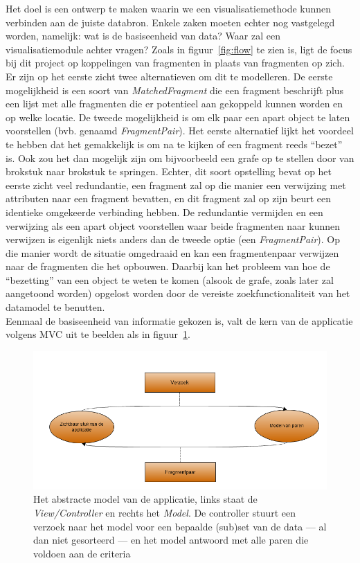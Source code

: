 Het doel is een ontwerp te maken waarin we een visualisatiemethode kunnen verbinden aan de juiste databron. Enkele zaken moeten echter nog vastgelegd worden, namelijk: wat is de basiseenheid van data? Waar zal een visualisatiemodule achter vragen? Zoals in figuur~\ref{fig:flow} te zien is, ligt de focus bij dit project op koppelingen van fragmenten in plaats van fragmenten op zich. Er zijn op het eerste zicht twee alternatieven om dit te modelleren. De eerste mogelijkheid is een soort van \emph{MatchedFragment} die een fragment beschrijft plus een lijst met alle fragmenten die er potentieel aan gekoppeld kunnen worden en op welke locatie. De tweede mogelijkheid is om elk paar een apart object te laten voorstellen (bvb. genaamd \emph{FragmentPair}). Het eerste alternatief lijkt het voordeel te hebben dat het gemakkelijk is om na te kijken of een fragment reeds ``bezet'' is. Ook zou het dan mogelijk zijn om bijvoorbeeld een grafe op te stellen door van brokstuk naar brokstuk te springen. Echter, dit soort opstelling bevat op het eerste zicht veel redundantie, een fragment zal op die manier een verwijzing met attributen naar een fragment bevatten, en dit fragment zal op zijn beurt een identieke omgekeerde verbinding hebben. De redundantie vermijden en een verwijzing als een apart object voorstellen waar beide fragmenten naar kunnen verwijzen is eigenlijk niets anders dan de tweede optie (een \emph{FragmentPair}). Op die manier wordt de situatie omgedraaid en kan een fragmentenpaar verwijzen naar de fragmenten die het opbouwen. Daarbij kan het probleem van hoe de ``bezetting'' van een object te weten te komen (alsook de grafe, zoals later zal aangetoond worden) opgelost worden door de vereiste zoekfunctionaliteit van het datamodel te benutten.\\

Eenmaal de basiseenheid van informatie gekozen is, valt de kern van de applicatie volgens MVC uit te beelden als in figuur~\ref{fig:basicprogramflow}.

\begin{figure}[ht]
	\begin{center}
		\includegraphics[width=1.0\columnwidth]{images/BasicExecutionFlow.png}
		\caption{Het abstracte model van de applicatie, links staat de \emph{View/Controller} en rechts het \emph{Model}. De controller stuurt een verzoek naar het model voor een bepaalde (sub)set van de data --- al dan niet gesorteerd --- en het model antwoord met alle paren die voldoen aan de criteria}
		\label{fig:basicprogramflow}
	\end{center}
\end{figure}

